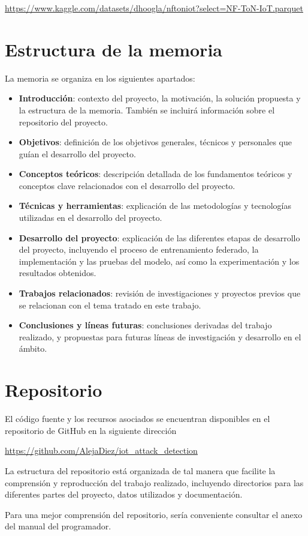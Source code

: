 \url{https://www.kaggle.com/datasets/dhoogla/nftoniot?select=NF-ToN-IoT.parquet}

\section{Estructura de la memoria}
\label{sec:Estructura}
La memoria se organiza en los siguientes apartados:
\begin{itemize}
    \item \textbf{Introducción}: contexto del proyecto, la motivación, la solución propuesta y la estructura de la memoria. También se incluirá información sobre el repositorio del proyecto.
    \item \textbf{Objetivos}: definición de los objetivos generales, técnicos y personales que guían el desarrollo del proyecto.
    \item \textbf{Conceptos teóricos}: descripción detallada de los fundamentos teóricos y conceptos clave relacionados con el desarrollo del proyecto.
    \item \textbf{Técnicas y herramientas}: explicación de las metodologías y tecnologías utilizadas en el desarrollo del proyecto.
    \item \textbf{Desarrollo del proyecto}: explicación de las diferentes etapas de desarrollo del proyecto, incluyendo el proceso de entrenamiento federado, la implementación y las pruebas del modelo, así como la experimentación y los resultados obtenidos.
    \item \textbf{Trabajos relacionados}: revisión de investigaciones y proyectos previos que se relacionan con el tema tratado en este trabajo.
    \item \textbf{Conclusiones y líneas futuras}: conclusiones derivadas del trabajo realizado, y propuestas para futuras líneas de investigación y desarrollo en el ámbito.
\end{itemize}

\section{Repositorio}
\label{sec:Repositorio}
El código fuente y los recursos asociados se encuentran disponibles en el repositorio de GitHub en la siguiente dirección

\url{https://github.com/AlejaDiez/iot_attack_detection}

La estructura del repositorio está organizada de tal manera que facilite la comprensión y reproducción del trabajo realizado, incluyendo directorios para las diferentes partes del proyecto, datos utilizados y documentación.

Para una mejor comprensión del repositorio, sería conveniente consultar el anexo del manual del programador.
